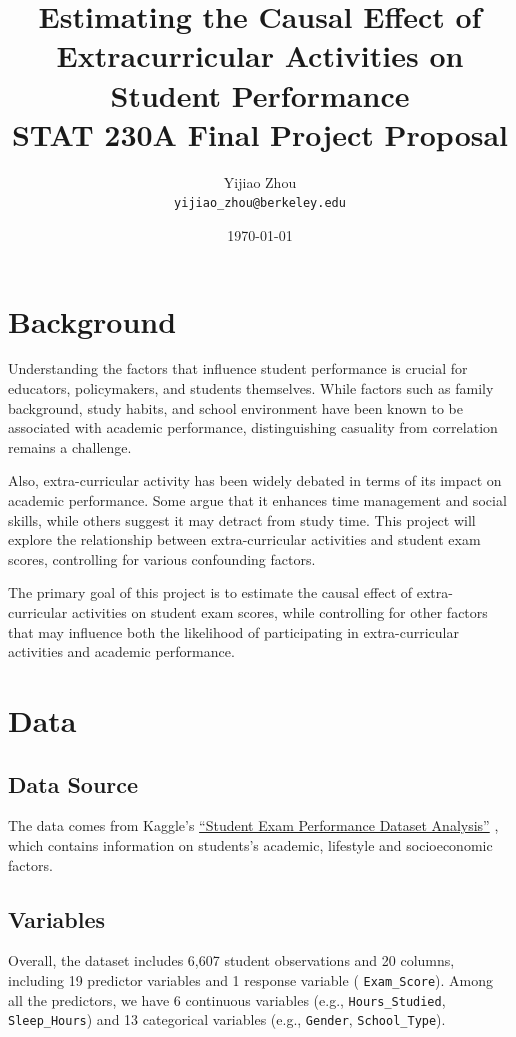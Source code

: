 \documentclass[11pt]{article}
\title{Estimating the Causal Effect of Extracurricular Activities on Student Performance\\[4pt]\large STAT 230A Final Project Proposal}
\author{Yijiao Zhou\\ \texttt{yijiao\_zhou@berkeley.edu}}
\date{\today}
\begin{document}
\maketitle

\section{Background}

Understanding the factors that influence student performance is crucial for educators, policymakers, and students themselves. While factors such as family background, study habits, and school environment have been known to be associated with academic performance, distinguishing casuality from correlation remains a challenge. 

Also, extra-curricular activity has been widely debated in terms of its impact on academic performance. Some argue that it enhances time management and social skills, while others suggest it may detract from study time. This project will explore the relationship between extra-curricular activities and student exam scores, controlling for various confounding factors.


The primary goal of this project is to estimate the causal effect of extra-curricular activities on student exam scores, while controlling for other factors that may influence both the likelihood of participating in extra-curricular activities and academic performance.

\section{Data}
\subsection{Data Source}

The data comes from Kaggle's \href{https://www.kaggle.com/datasets/grandmaster07/student-exam-performance-dataset-analysis/data}{ ``Student Exam Performance Dataset Analysis''} \cite{kaggle_student_performance}, which contains information on students's academic, lifestyle and socioeconomic factors. 

\subsection{Variables}
Overall, the dataset includes 6,607 student observations and 20 columns, including 19 predictor variables and 1 response variable ( \texttt{Exam\_Score}). Among all the predictors, we have 6 continuous variables (e.g., \texttt{Hours\_Studied}, \texttt{Sleep\_Hours}) and  13 categorical variables (e.g., \texttt{Gender}, \texttt{School\_Type}). 
\end{document}
